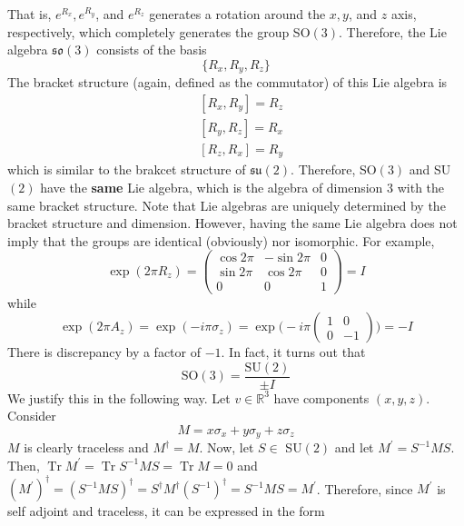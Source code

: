 \documentclass{article}
\DeclareMathOperator{\Tr}{Tr}
\newcounter{example}[section]
\begin{document}
    That is, $e^{R_x}, e^{R_y}$, and $e^{R_z}$ generates a rotation around the $x, y$, and $z$ axis, respectively, which completely generates the group SO$(3)$. Therefore, the Lie algebra $\mathfrak{so}(3)$ consists of the basis 
    \begin{equation}
      \{R_x, R_y, R_z\}
    \end{equation}
    The bracket structure (again, defined as the commutator) of this Lie algebra is 
    \begin{align*}
      & [R_x, R_y] = R_z \\
      & [R_y, R_z] = R_x \\
      & [R_z, R_x] = R_y
    \end{align*}
    which is similar to the brakcet structure of $\mathfrak{su}(2)$. Therefore, SO$(3)$ and SU$(2)$ have the \textbf{same} Lie algebra, which is the algebra of dimension 3 with the same bracket structure. Note that Lie algebras are uniquely determined by the bracket structure and dimension. However, having the same Lie algebra does not imply that the groups are identical (obviously) nor isomorphic. For example, 
    \begin{equation}
      \exp(2\pi R_z) = \begin{pmatrix}
      \cos{2\pi} & -\sin{2\pi} & 0 \\
      \sin{2\pi} & \cos{2\pi} & 0 \\
      0 & 0 & 1
      \end{pmatrix} = I
    \end{equation}
    while 
    \begin{equation}
      \exp(2\pi A_z) = 
      \exp(-i \pi \sigma_z) = \exp \bigg(-i \pi \begin{pmatrix}
      1&0\\0&-1
      \end{pmatrix} \bigg) = -I
    \end{equation}
    There is discrepancy by a factor of $-1$. In fact, it turns out that
    \begin{equation}
      \text{SO}(3) = \frac{\text{SU}(2)}{\pm I}
    \end{equation}
    We justify this in the following way. Let $v \in \mathbb{R}^3$ have components $(x, y, z)$. Consider
    \begin{equation}
      M = x \sigma_x + y \sigma_y + z \sigma_z
    \end{equation}
    $M$ is clearly traceless and $M^\dagger = M$. Now, let $S \in$ SU$(2)$ and let $M^\prime = S^{-1} M S$. Then, $\Tr{M^\prime} = \Tr{S^{-1} M S} = \Tr{M} = 0$ and $(M^\prime)^\dagger = (S^{-1} M S)^\dagger = S^\dagger M^\dagger (S^{-1})^\dagger = S^{-1} M S = M^\prime$. Therefore, since $M^\prime$ is self adjoint and traceless, it can be expressed in the form
\end{document}
